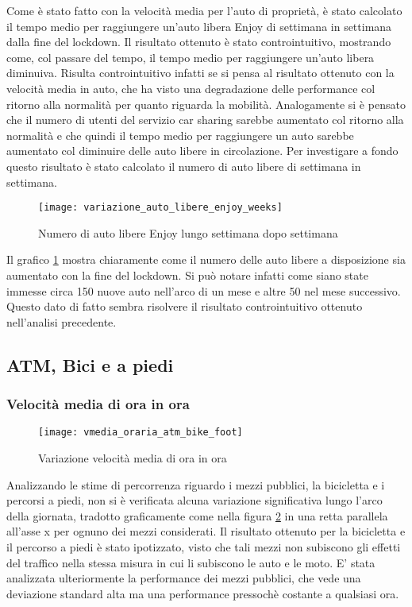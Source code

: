 Come è stato fatto con la velocità media per l'auto di proprietà, è stato calcolato il tempo medio per raggiungere un'auto libera Enjoy di settimana in settimana dalla fine del lockdown. Il risultato ottenuto è stato controintuitivo, mostrando come, col passare del tempo, il tempo medio per raggiungere un'auto libera diminuiva. Risulta controintuitivo infatti se si pensa al risultato ottenuto con la velocità media in auto, che ha visto una degradazione delle performance col ritorno alla normalità per quanto riguarda la mobilità. Analogamente si è pensato che il numero di utenti del servizio car sharing sarebbe aumentato col ritorno alla normalità e che quindi il tempo medio per raggiungere un auto sarebbe aumentato col diminuire delle auto libere in circolazione. Per investigare a fondo questo risultato è stato calcolato il numero di auto libere di settimana in settimana.

\begin{figure}[H]
	\texttt{[image: variazione\_auto\_libere\_enjoy\_weeks]}
	\caption{Numero di auto libere Enjoy lungo settimana dopo settimana}
	\label{image:7}
\end{figure}

Il grafico \ref{image:7} mostra chiaramente come il numero delle auto libere a disposizione sia aumentato con la fine del lockdown. Si può notare infatti come siano state immesse circa 150 nuove auto nell'arco di un mese e altre 50 nel mese successivo. Questo dato di fatto sembra risolvere il risultato controintuitivo ottenuto nell'analisi precedente.


\subsection{ATM, Bici e a piedi}

\subsubsection{Velocità media di ora in ora}

\begin{figure}[H]
	\texttt{[image: vmedia\_oraria\_atm\_bike\_foot]}
	\caption{Variazione velocità media di ora in ora}
	\label{image:8}
\end{figure}

Analizzando le stime di percorrenza riguardo i mezzi pubblici, la bicicletta e i percorsi a piedi, non si è verificata alcuna variazione significativa lungo l'arco della giornata, tradotto graficamente come nella figura \ref{image:8} in una retta parallela all'asse x per ognuno dei mezzi considerati. Il risultato ottenuto per la bicicletta e il percorso a piedi è stato ipotizzato, visto che tali mezzi non subiscono gli effetti del traffico nella stessa misura in cui li subiscono le auto e le moto. E' stata analizzata ulteriormente la performance dei mezzi pubblici, che vede una deviazione standard alta ma una performance pressochè costante a qualsiasi ora.

